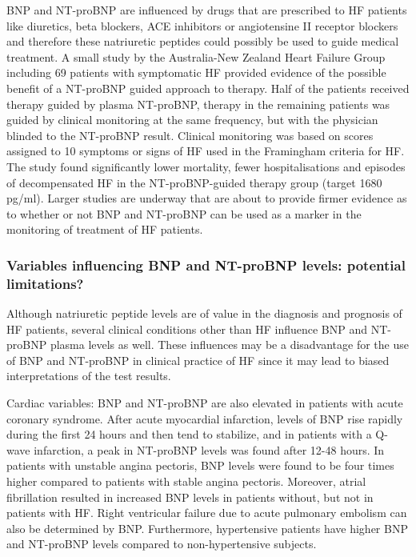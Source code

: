 \documentclass[14pt,a4paper,onecolumn]{extarticle}
\begin{document}
BNP and NT-proBNP are influenced by drugs that are prescribed to HF patients like diuretics, \citep{Tsutamoto2004} beta blockers, \citep{Richards1999} ACE inhibitors or angiotensine II receptor blockers \citep{Latini2002} and therefore these natriuretic peptides could possibly be used to guide medical treatment. A small study by the Australia-New Zealand Heart Failure Group including 69 patients with symptomatic HF provided evidence of the possible benefit of a NT-proBNP guided approach to therapy. Half of the patients received therapy guided by plasma NT-proBNP, therapy in the remaining patients was guided by clinical monitoring at the same frequency, but with the physician blinded to the NT-proBNP result. Clinical monitoring was based on scores assigned to 10 symptoms or signs of HF used in the Framingham criteria for HF.
The study found significantly lower mortality, fewer hospitalisations and episodes of decompensated HF in the NT-proBNP-guided therapy group (target 1680 pg/ml). \citep{Troughton2000} Larger studies are underway that are about to provide firmer evidence as to whether or not BNP and NT-proBNP can be used as a marker in the monitoring of treatment of HF patients. \citep{Buckley1999} %

\subsubsection{Variables influencing BNP and NT-proBNP levels: potential limitations?}
Although natriuretic peptide levels are of value in the diagnosis and prognosis of HF patients, several clinical conditions other than HF influence BNP and NT-proBNP plasma levels as well. These influences may be a disadvantage for the use of BNP and NT-proBNP in clinical practice of HF since it may lead to biased interpretations of the test results.

Cardiac variables:
BNP and NT-proBNP are also elevated in patients with acute coronary syndrome. After acute myocardial infarction, levels of BNP rise rapidly during the first 24 hours and then tend to stabilize, \citep{deLemos2001} and in patients with a Q-wave infarction, a peak in NT-proBNP levels was found after 12-48 hours. \citep{Talwar2000} In patients with unstable angina pectoris, BNP levels were found to be four times higher compared to patients with stable angina pectoris. \citep{Kikuta1996}
Moreover, atrial fibrillation resulted in increased BNP levels in patients without, but not in patients with HF. \citep{Knudsen2005} Right ventricular failure due to acute pulmonary embolism can also be determined by BNP. \citep{Tulevski2002} Furthermore, hypertensive patients have higher BNP and NT-proBNP levels compared to non-hypertensive subjects. \citep{Boomsma2001}
\end{document}
